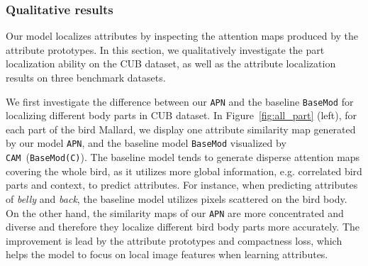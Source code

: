 \subsubsection{Qualitative results}
Our model localizes attributes by inspecting the attention maps produced by the attribute prototypes. In this section, we qualitatively investigate the part localization ability on the CUB dataset, as well as the attribute localization results on three benchmark datasets.

We first investigate the difference between our \texttt{APN} and the baseline \texttt{BaseMod} for localizing different body parts in CUB dataset. In Figure~\ref{fig:all_part} (left), for each part of the bird Mallard, we display one attribute similarity map generated by our model \texttt{APN}, and the baseline model \texttt{BaseMod} visualized by \texttt{CAM}~(\texttt{BaseMod(C)}). The baseline model tends to generate disperse attention maps covering the whole bird, as it utilizes more global information, e.g. correlated bird parts and context, to predict attributes. For instance, when predicting attributes of \textit{belly} and \textit{back}, the baseline model utilizes pixels scattered on the bird body.
On the other hand, the similarity maps of our \texttt{APN} are more concentrated and diverse and therefore they localize different bird body parts more accurately. The improvement is lead by the attribute prototypes and compactness loss, which helps the model to focus on local image features when learning attributes. 




